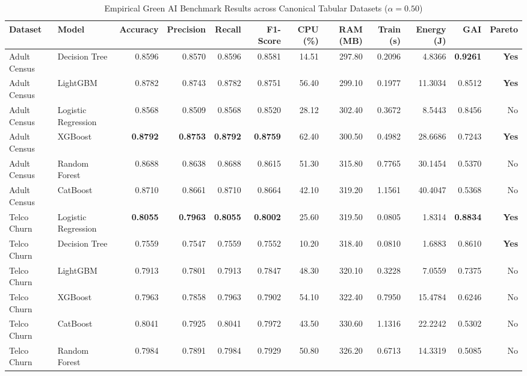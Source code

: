 \documentclass[conference]{IEEEtran}
\begin{document}
\begin{table}[t]
\centering
\caption{Empirical Green AI Benchmark Results across Canonical Tabular Datasets ($\alpha = 0.50$)}
\label{tab:empirical_results}
\begin{tabular}{llrrrrrrrrrr}
\toprule
\textbf{Dataset} & \textbf{Model} & \textbf{Accuracy} & \textbf{Precision} & \textbf{Recall} & \textbf{F1-Score} & \textbf{CPU (\%)} & \textbf{RAM (MB)} & \textbf{Train (s)} & \textbf{Energy (J)} & \textbf{GAI} & \textbf{Pareto} \\
\midrule
Adult Census & Decision Tree       & 0.8596 & 0.8570 & 0.8596 & 0.8581 & 14.51 & 297.80 & 0.2096 & 4.8366  & \textbf{0.9261} & \textbf{Yes} \\
Adult Census & LightGBM            & 0.8782 & 0.8743 & 0.8782 & 0.8751 & 56.40 & 299.10 & 0.1977 & 11.3034 & 0.8512 & \textbf{Yes} \\
Adult Census & Logistic Regression & 0.8568 & 0.8509 & 0.8568 & 0.8520 & 28.12 & 302.40 & 0.3672 & 8.5443  & 0.8456 & No \\
Adult Census & XGBoost             & \textbf{0.8792} & \textbf{0.8753} & \textbf{0.8792} & \textbf{0.8759} & 62.40 & 300.50 & 0.4982 & 28.6686 & 0.7243 & \textbf{Yes} \\
Adult Census & Random Forest       & 0.8688 & 0.8638 & 0.8688 & 0.8615 & 51.30 & 315.80 & 0.7765 & 30.1454 & 0.5370 & No \\
Adult Census & CatBoost            & 0.8710 & 0.8661 & 0.8710 & 0.8664 & 42.10 & 319.20 & 1.1561 & 40.4047 & 0.5368 & No \\
\midrule
Telco Churn  & Logistic Regression & \textbf{0.8055} & \textbf{0.7963} & \textbf{0.8055} & \textbf{0.8002} & 25.60 & 319.50 & 0.0805 & 1.8314  & \textbf{0.8834} & \textbf{Yes} \\
Telco Churn  & Decision Tree       & 0.7559 & 0.7547 & 0.7559 & 0.7552 & 10.20 & 318.40 & 0.0810 & 1.6883  & 0.8610 & \textbf{Yes} \\
Telco Churn  & LightGBM            & 0.7913 & 0.7801 & 0.7913 & 0.7847 & 48.30 & 320.10 & 0.3228 & 7.0559  & 0.7375 & No \\
Telco Churn  & XGBoost             & 0.7963 & 0.7858 & 0.7963 & 0.7902 & 54.10 & 322.40 & 0.7950 & 15.4784 & 0.6246 & No \\
Telco Churn  & CatBoost            & 0.8041 & 0.7925 & 0.8041 & 0.7972 & 43.50 & 330.60 & 1.1316 & 22.2242 & 0.5302 & No \\
Telco Churn  & Random Forest       & 0.7984 & 0.7891 & 0.7984 & 0.7929 & 50.80 & 326.20 & 0.6713 & 14.3319 & 0.5085 & No \\

\end{tabular}
\end{table}
\end{document}
